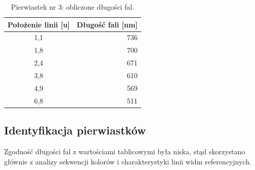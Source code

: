\documentclass[a4paper,12pt]{article}
\begin{document}
\begin{table}[H]
    \centering
    \begin{tabular}{|c|r|}
        \hline
        Położenie linii [u] & Długość fali [nm] \\ \hline
        1{,}1 & 736 \\ \hline
        1{,}8 & 700 \\ \hline
        2{,}4 & 671 \\ \hline
        3{,}8 & 610 \\ \hline
        4{,}9 & 569 \\ \hline
        6{,}8 & 511 \\ \hline
    \end{tabular}
    \caption{Pierwiastek nr 3: obliczone długości fal.}
    \label{tab:unknown3}
\end{table}

\subsection{Identyfikacja pierwiastków}

Zgodność długości fal z wartościami tablicowymi była niska, stąd skorzystano głównie z analizy sekwencji kolorów i charakterystyki linii widm referencyjnych.
\end{document}
